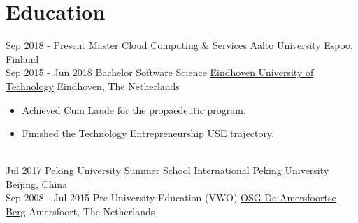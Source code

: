 \documentclass[letterpaper]{twentysecondcv} %
\begin{document}
\makeprofile %

\section{Education}

\begin{twenty} %
	\twentyitem
    	{Sep 2018 - }
        {Present}
        {Master Cloud Computing \& Services}
        {\href{https://aalto.fi/}{Aalto University}}
        {Espoo, Finland}
        {}
    \\
    \twentyitem
    	{Sep 2015 - }
        {Jun 2018}
        {Bachelor Software Science}
        {\href{https://www.tue.nl/}{Eindhoven University of Technology}}
        {Eindhoven, The Netherlands}
        {
       	\begin{itemize}
   			\item Achieved Cum Laude for the propaedeutic program.
            \item Finished the \href{https://educationguide.tue.nl/programs/bachelor-college/use-learning-trajectory/technology-entrepreneurship/}{Technology Entrepreneurship USE trajectory}.
		\end{itemize}
    	}
    \\
	\twentyitem
    	{Jul 2017}
		{}
        {Peking University Summer School International}
        {\href{http://www.oir.pku.edu.cn/summerschool/}{Peking University}}
        {Beijing, China}
        {
    	}
    \\
    \twentyitem
	    {Sep 2008 -}
	    {Jul 2015}
	    {Pre-University Education (VWO)}
	    {\href{http://www.amersfoortseberg.nl/}{OSG De Amersfoortse Berg}}
	    {Amersfoort, The Netherlands}
	    {
	    }
\end{twenty}

\end{document}
